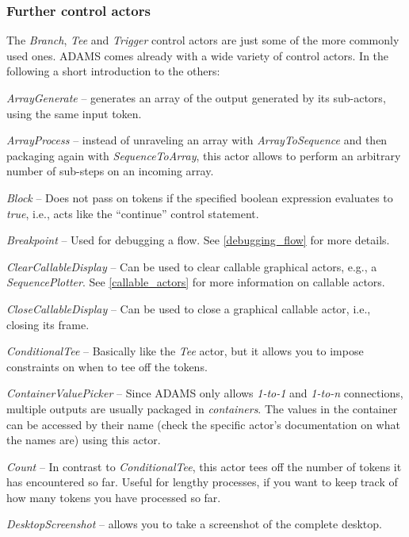 \subsubsection{Further control actors}
The \textit{Branch}, \textit{Tee} and \textit{Trigger} control actors are just
some of the more commonly used ones. ADAMS comes already with a wide variety of
control actors. In the following a short introduction to the others:
\begin{tight_itemize}
	\item \textit{ArrayGenerate} -- generates an array of the output
	generated by its sub-actors, using the same input token.
	\item \textit{ArrayProcess} -- instead of unraveling an array with
	\textit{ArrayToSequence} and then packaging again with
	\textit{SequenceToArray}, this actor allows to perform an arbitrary number of
	sub-steps on an incoming array.
	\item \textit{Block} -- Does not pass on tokens if the specified boolean
	expression evaluates to \textit{true}, i.e., acts like the ``continue''
	control statement.
	\item \textit{Breakpoint} -- Used for debugging a flow. See
	\ref{debugging_flow} for more details.
	\item \textit{ClearCallableDisplay} -- Can be used to clear callable
	graphical actors, e.g., a \textit{SequencePlotter}. See \ref{callable_actors} for
	more information on callable actors.
	\item \textit{CloseCallableDisplay} -- Can be used to close a graphical
	callable actor, i.e., closing its frame.
	\item \textit{ConditionalTee} -- Basically like the \textit{Tee} actor, but it
	allows you to impose constraints on when to tee off the tokens.
	\item \textit{ContainerValuePicker} -- Since ADAMS only allows \textit{1-to-1}
	and \textit{1-to-n} connections, multiple outputs are usually packaged in
	\textit{containers}. The values in the container can be accessed by their name
	(check the specific actor's documentation on what the names are) using this
	actor.
	\item \textit{Count} -- In contrast to \textit{ConditionalTee}, this actor tees
	off the number of tokens it has encountered so far. Useful for lengthy
	processes, if you want to keep track of how many tokens you have processed so
	far.
	\item \textit{DesktopScreenshot} -- allows you to take a screenshot
	of the complete desktop.

\end{tight_itemize}

